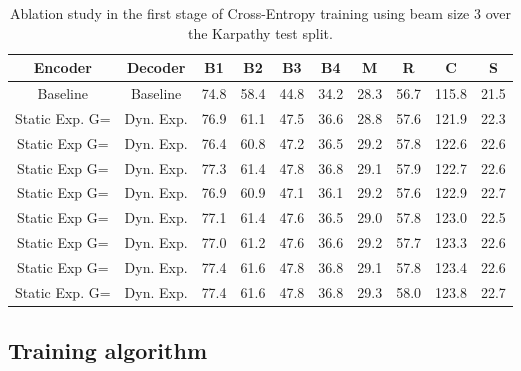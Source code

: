 \begin{table*}[htb!]
  \centering
  \footnotesize
  \caption{Ablation study in the first stage of Cross-Entropy training using beam size 3 over the Karpathy test split.}
  \begin{tabular}{| c c | c  c  c  c  c  c  c  c |} 
 \hline
 Encoder & Decoder & B1 & B2 & B3 & B4 & M & R & C & S \\
 \hline
 Baseline & Baseline & 74.8 & 58.4 & 44.8 & 34.2 & 28.3 & 56.7 & 115.8 & 21.5 \\
 \hline
 Static Exp. G= & Dyn. Exp. & 76.9 & 61.1 & 47.5 & 36.6 & 28.8 & 57.6 & 121.9 & 22.3 \\
 \hline
 Static Exp G= & Dyn. Exp. & 76.4 & 60.8 & 47.2 & 36.5 & 29.2 & 57.8 & 122.6 & 22.6 \\
 \hline
 Static Exp G= & Dyn. Exp. & 77.3 & 61.4 & 47.8 & 36.8 & 29.1 & 57.9 & 122.7 & 22.6 \\
 \hline
 Static Exp G= & Dyn. Exp. & 76.9 & 60.9 & 47.1 & 36.1 & 29.2 & 57.6 & 122.9 & 22.7 \\
 \hline
 Static Exp G= & Dyn. Exp. &  77.1 & 61.4 & 47.6 & 36.5 & 29.0 & 57.8 & 123.0 & 22.5 \\
 \hline
 Static Exp G= & Dyn. Exp. & 77.0 & 61.2 & 47.6 & 36.6 & 29.2 & 57.7 & 123.3 & 22.6 \\
 \hline
 Static Exp G= & Dyn. Exp. & 77.4 & 61.6 & 47.8 & 36.8 & 29.1 & 57.8 & 123.4 & 22.6 \\
 \hline
 Static Exp. G= & Dyn. Exp. & 77.4 & 61.6 & 47.8 & 36.8 & 29.3 & 58.0 &  123.8 & 22.7 \\
 \hline
 \end{tabular}
 \label{tab:ablation_1}
\end{table*} 


\subsection{Training algorithm}
\label{training_section}

